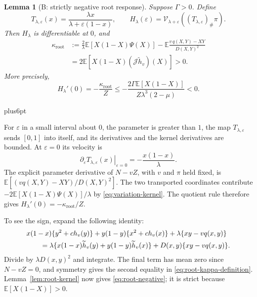 \documentclass[11pt,reqno]{amsart}
\makeatletter
\theoremstyle{plain}
\newtheorem{lemma}[theorem]{Lemma}
\theoremstyle{definition}
\theoremstyle{remark}
\renewenvironment{proof}[1][\proofname]{%
  \par
  \pushQED{\qed}%
  \normalfont
  \topsep6pt plus6pt\relax
  \trivlist
  \item[\hskip\labelsep\slshape #1\@addpunct{.}]%
  \ignorespaces
}{%
  \popQED
  \endtrivlist
  \@endpefalse
}
\DeclareRobustCommand{\qed}{%
  \leavevmode\unskip\penalty9999\hbox{}\nobreak
  \ifmmode
    \makebox[0pt][l]{\qquad\hbox{\qedsymbol}}%
  \else
    \qquad\hbox{\qedsymbol}%
  \fi
}
\renewcommand{\qedsymbol}{\rule[.47pt]{4pt}{6pt}}
\numberwithin{equation}{section}
\newcommand{\E}{\mathbb E}
\newcommand{\cJ}{\mathcal J}
\makeatother
\begin{document}
\begin{samepage}
\begin{lemma}[B: strictly negative root response]\label{lem:root-B}
Suppose $\Gamma>0$. Define
\begin{equation}\label{eq:root-map}
 T_{\lambda,\varepsilon}(x)
 =\frac{\lambda x}{\lambda+\varepsilon(1-x)},\qquad
 H_\lambda(\varepsilon)
 =\mathcal V_{\lambda+\varepsilon}
       ((T_{\lambda,\varepsilon})_\#\pi).
\end{equation}
Then $H_\lambda$ is differentiable at $0$, and
\begin{equation}\label{eq:root-kappa-definition}
 \begin{aligned}
 \kappa_{\mathrm{root}}
 &:=\frac2\lambda\E[X(1-X)\Psi(X)]
       -\E\frac{v\,q(X,Y)-XY}{D(X,Y)^2}\\
 &=2\E[X(1-X)(\cJ\widetilde h_v)(X)]>0.
 \end{aligned}
\end{equation}
More precisely,
\begin{equation}\label{eq:root-negative}
 H_\lambda'(0)=-\frac{\kappa_{\mathrm{root}}}{Z}
 \le-\frac{2\Gamma\E[X(1-X)]}{Z\lambda^3(2-\mu)}<0.
\end{equation}
\end{lemma}
\end{samepage}

\begin{proof}
For $\varepsilon$ in a small interval about $0$, the parameter is greater
than $1$, the map $T_{\lambda,\varepsilon}$ sends $[0,1]$ into itself,
and its derivatives and the kernel derivatives are bounded.
At $\varepsilon=0$ its velocity is
\[
 \left.\partial_\varepsilon T_{\lambda,\varepsilon}(x)
       \right|_{\varepsilon=0}=-\frac{x(1-x)}{\lambda}.
\]
The explicit parameter derivative of $N-vZ$, with $v$ and $\pi$ held
fixed, is $\E[(v q(X,Y)-XY)/D(X,Y)^2]$.
The two transported coordinates contribute
$-2\E[X(1-X)\Psi(X)]/\lambda$ by
\eqref{eq:variation-kernel}. The quotient rule therefore gives
$H_\lambda'(0)=-\kappa_{\mathrm{root}}/Z$.

To see the sign, expand the following identity:
\begin{align}
 &x(1-x)\{y^2+c h_v(y)\}+y(1-y)\{x^2+c h_v(x)\}
       +\lambda\{xy-vq(x,y)\}\notag\\
 &\qquad=\lambda\{x(1-x)\widetilde h_v(y)
                   +y(1-y)\widetilde h_v(x)\}
       +D(x,y)\{xy-vq(x,y)\}.
 \label{eq:root-pointwise-cancellation}
\end{align}
Divide by $\lambda D(x,y)^2$ and integrate. The final term has mean
zero since $N-vZ=0$, and symmetry gives the second equality in
\eqref{eq:root-kappa-definition}. Lemma~\ref{lem:root-kernel} now gives
\eqref{eq:root-negative}; it is strict because
$\E[X(1-X)]>0$.
\end{proof}
\end{document}
